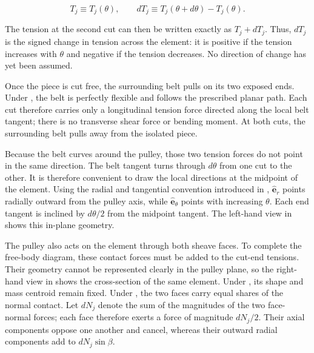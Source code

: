 \documentclass[11pt]{report}
\numberwithin{equation}{section}
\newcounter{assump}
\begin{document}
\begin{equation}
    T_j
    \equiv
    T_j(\theta),
    \qquad
    dT_j
    \equiv
    T_j(\theta+d\theta)-T_j(\theta).
    \label{eq:wrap_tension_increment_definition}
\end{equation}

The tension at the second cut can then be written exactly as \(T_j+dT_j\).
Thus, \(dT_j\) is the signed change in tension across the element: it is
positive if the tension increases with \(\theta\) and negative if the tension
decreases. No direction of change has yet been assumed.

Once the piece is cut free, the surrounding belt pulls on its two exposed
ends. Under , the belt is perfectly
flexible and follows the prescribed planar path. Each cut therefore carries
only a longitudinal tension force directed along the local belt tangent; there
is no transverse shear force or bending moment. At both cuts, the surrounding
belt pulls away from the isolated piece.

Because the belt curves around the pulley, those two tension forces do not
point in the same direction. The belt tangent turns through \(d\theta\) from
one cut to the other. It is therefore convenient to draw the local directions
at the midpoint of the element. Using the radial and tangential convention
introduced in , \(\hat{\mathbf e}_r\) points
radially outward from the pulley axis, while \(\hat{\mathbf e}_\theta\) points
with increasing \(\theta\). Each end tangent is inclined by \(d\theta/2\) from
the midpoint tangent. The left-hand view in
 shows this in-plane geometry.

The pulley also acts on the element through both sheave faces. To complete the
free-body diagram, these contact forces must be added to the cut-end tensions.
Their geometry cannot be represented clearly in the pulley plane, so the
right-hand view in  shows the cross-section
of the same element. Under , its shape
and mass centroid remain fixed. Under
, the two faces carry equal shares of the
normal contact. Let \(dN_j\) denote the sum of the magnitudes of the two
face-normal forces; each face therefore exerts a force of magnitude
\(dN_j/2\). Their axial components oppose one another and cancel, whereas their
outward radial components add to \(dN_j\sin\beta\).
\end{document}
